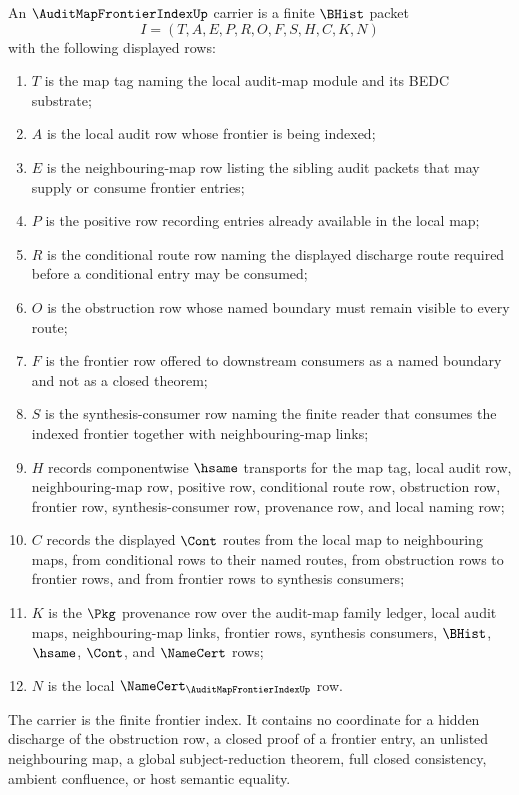 \begin{definition}
\label{def:audit-map-frontier-index-carrier}
An $\AuditMapFrontierIndexUp$ carrier is a finite $\BHist$ packet
$$
I=(T,A,E,P,R,O,F,S,H,C,K,N)
$$
with the following displayed rows:
\begin{enumerate}
\item $T$ is the map tag naming the local audit-map module and its BEDC substrate;
\item $A$ is the local audit row whose frontier is being indexed;
\item $E$ is the neighbouring-map row listing the sibling audit packets that may supply or consume frontier entries;
\item $P$ is the positive row recording entries already available in the local map;
\item $R$ is the conditional route row naming the displayed discharge route required before a conditional entry may be consumed;
\item $O$ is the obstruction row whose named boundary must remain visible to every route;
\item $F$ is the frontier row offered to downstream consumers as a named boundary and not as a closed theorem;
\item $S$ is the synthesis-consumer row naming the finite reader that consumes the indexed frontier together with neighbouring-map links;
\item $H$ records componentwise $\hsame$ transports for the map tag, local audit row, neighbouring-map row, positive row, conditional route row, obstruction row, frontier row, synthesis-consumer row, provenance row, and local naming row;
\item $C$ records the displayed $\Cont$ routes from the local map to neighbouring maps, from conditional rows to their named routes, from obstruction rows to frontier rows, and from frontier rows to synthesis consumers;
\item $K$ is the $\Pkg$ provenance row over the audit-map family ledger, local audit maps, neighbouring-map links, frontier rows, synthesis consumers, $\BHist$, $\hsame$, $\Cont$, and $\NameCert$ rows;
\item $N$ is the local $\NameCert_{\AuditMapFrontierIndexUp}$ row.
\end{enumerate}
The carrier is the finite frontier index. It contains no coordinate for a hidden discharge of the obstruction row, a closed proof of a frontier entry, an unlisted neighbouring map, a global subject-reduction theorem, full closed consistency, ambient confluence, or host semantic equality.
\end{definition}

